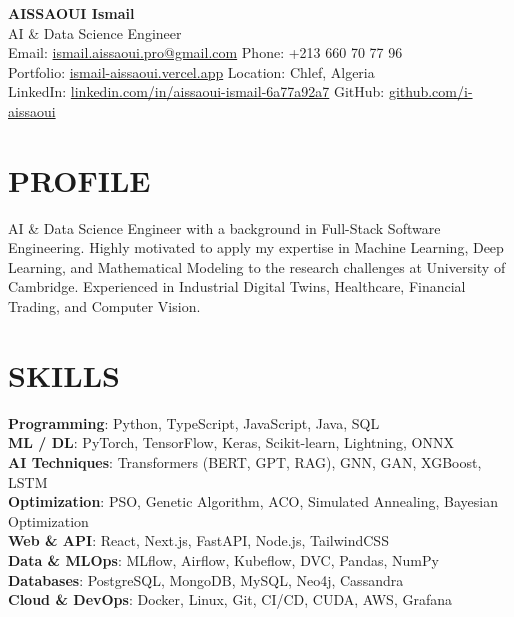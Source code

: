 \documentclass[a4paper,12pt]{article}
\begin{document}
\begin{center}
    {\Huge\bfseries\color{titleblue} AISSAOUI Ismail}\\[4pt]
    {\Large AI \& Data Science Engineer}\\[6pt]

    {\normalsize
    Email: \href{mailto:ismail.aissaoui.pro@gmail.com}{ismail.aissaoui.pro@gmail.com} \quad
    Phone: +213 660 70 77 96 \\
    Portfolio: \href{https://ismail-aissaoui.vercel.app}{ismail-aissaoui.vercel.app} \quad
    Location: Chlef, Algeria \\
    LinkedIn: \href{https://linkedin.com/in/aissaoui-ismail-6a77a92a7}{linkedin.com/in/aissaoui-ismail-6a77a92a7} \quad
    GitHub: \href{https://github.com/i-aissaoui}{github.com/i-aissaoui}
    }
\end{center}

\section{PROFILE}
AI \& Data Science Engineer with a background in Full-Stack Software Engineering. Highly motivated to apply my expertise in Machine Learning, Deep Learning, and Mathematical Modeling to the research challenges at University of Cambridge. Experienced in Industrial Digital Twins, Healthcare, Financial Trading, and Computer Vision.

\section{SKILLS}
\textbf{Programming}: Python, TypeScript, JavaScript, Java, SQL \\
\textbf{ML / DL}: PyTorch, TensorFlow, Keras, Scikit-learn, Lightning, ONNX \\
\textbf{AI Techniques}: Transformers (BERT, GPT, RAG), GNN, GAN, XGBoost, LSTM \\
\textbf{Optimization}: PSO, Genetic Algorithm, ACO, Simulated Annealing, Bayesian Optimization \\
\textbf{Web \& API}: React, Next.js, FastAPI, Node.js, TailwindCSS \\
\textbf{Data \& MLOps}: MLflow, Airflow, Kubeflow, DVC, Pandas, NumPy \\
\textbf{Databases}: PostgreSQL, MongoDB, MySQL, Neo4j, Cassandra \\
\textbf{Cloud \& DevOps}: Docker, Linux, Git, CI/CD, CUDA, AWS, Grafana 
\end{document}
